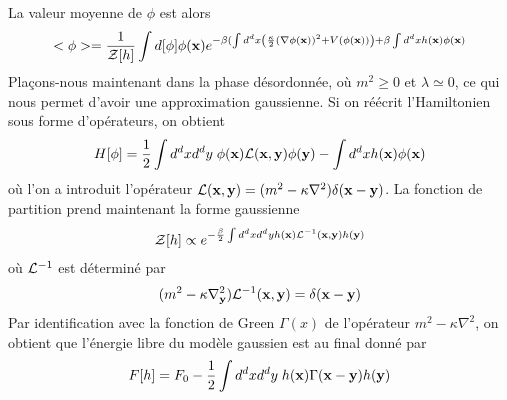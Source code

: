 La valeur moyenne de $\phi$ est alors
\begin{align}
    <\phi> =  \frac{1}{\mathcal{Z}[h]} \int d [\phi] \phi({\bf x})e^{ - \beta (\int d^d x \left( \frac{\kappa}{2} (\nabla \phi({\bf x}))^2 + V(\phi({\bf x})) \right) + \beta \int d^d x h({\bf x}) \phi({\bf x})}
\end{align}
Plaçons-nous maintenant dans la phase désordonnée, où $m^2 \ge 0$ et $\lambda \simeq 0$, ce qui nous permet d'avoir une approximation gaussienne. Si on réécrit l'Hamiltonien sous forme d'opérateurs, on obtient 
\begin{align}
    H[\phi] = \frac{1}{2} \int d^d x d^d y \; \phi({\bf x}) \mathcal{L}({\bf x},{\bf y}) \phi({\bf y}) - \int d^d x h({\bf x}) \phi({\bf x})
\end{align}
où l'on a introduit l'opérateur $\mathcal{L}({\bf x},{\bf y}) = (m^2 - \kappa \nabla^2) \delta({\bf x}-{\bf y})$.
La fonction de partition prend maintenant la forme gaussienne
\begin{align}
    \mathcal{Z}[h] \propto e^{- \frac{\beta}{2} \int d^d x d^d y h({\bf x}) \mathcal{L}^{-1}({\bf x},{\bf y}) h({\bf y})}
\end{align}
où $\mathcal{L}^{-1}$ est déterminé par 
\begin{align}
    (m^2 - \kappa \nabla_{\bf y}^2) \mathcal{L}^{-1}({\bf x},{\bf y}) = \delta({\bf x}-{\bf y})
\end{align}
Par identification avec la fonction de Green $\Gamma(x)$ de l'opérateur $m^2 - \kappa \nabla^2$, on obtient que l'énergie libre du modèle gaussien est au final donné par 
\begin{align}
    F[h] = F_0 - \frac{1}{2} \int d^d x d^dy \;  h({\bf x}) \Gamma({\bf x}-{\bf y}) h({\bf y})
\end{align}

